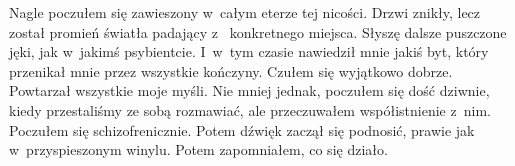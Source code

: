 Nagle poczułem się zawieszony w~całym eterze tej nicości. Drzwi znikły, lecz został promień światła padający z~
konkretnego miejsca. Słyszę dalsze puszczone jęki, jak w~jakimś psybientcie. I~w~tym czasie nawiedził mnie jakiś byt, 
który przenikał mnie przez wszystkie kończyny. Czułem się wyjątkowo dobrze. Powtarzał wszystkie moje myśli. Nie mniej 
jednak, poczułem się dość dziwnie, kiedy przestaliśmy ze sobą rozmawiać, ale przeczuwałem współistnienie z~nim. 
Poczułem się schizofrenicznie. Potem dźwięk zaczął się podnosić, prawie jak w~przyspieszonym winylu. Potem 
zapomniałem, co się działo.

